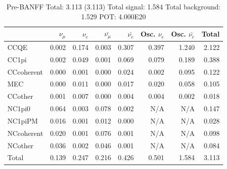 

\begin{table}
\center
\begin{tabular} { | l ||r | r | r | r | r | r | | r | }
\hline
              & $\nu_\mu$            & $\nu_e$              & $\bar{\nu_\mu}$      & $\bar{\nu_e}$        & Osc. $\nu_e$         & Osc. $\bar{\nu_e}$   & Total                \\ \hline\hline
 CCQE         & 0.002                & 0.174                & 0.003                & 0.307                & 0.397                & 1.240                & 2.122                \\ \hline
 CC1pi        & 0.002                & 0.049                & 0.001                & 0.069                & 0.079                & 0.189                & 0.388                \\ \hline
 CCcoherent   & 0.000                & 0.001                & 0.000                & 0.024                & 0.002                & 0.095                & 0.122                \\ \hline
 MEC          & 0.000                & 0.011                & 0.000                & 0.017                & 0.020                & 0.058                & 0.105                \\ \hline
 CCother      & 0.001                & 0.007                & 0.000                & 0.004                & 0.004                & 0.002                & 0.018                \\ \hline
 NC1pi0       & 0.064                & 0.003                & 0.078                & 0.002                & N/A                  & N/A                  & 0.147                \\ \hline
 NC1piPM      & 0.016                & 0.001                & 0.012                & 0.000                & N/A                  & N/A                  & 0.028                \\ \hline
 NCcoherent   & 0.020                & 0.001                & 0.076                & 0.001                & N/A                  & N/A                  & 0.098                \\ \hline
 NCother      & 0.036                & 0.002                & 0.046                & 0.001                & N/A                  & N/A                  & 0.084                \\ \hline
\hline
 Total        & 0.139                & 0.247                & 0.216                & 0.426                & 0.501                & 1.584                & 3.113                \\ \hline

\end{tabular}
\caption{
Pre-BANFF
Total: 3.113    (3.113)
Total signal: 1.584
Total background: 1.529
POT: 4.000E20
}
\label{tab:ciao}
\end{table}



